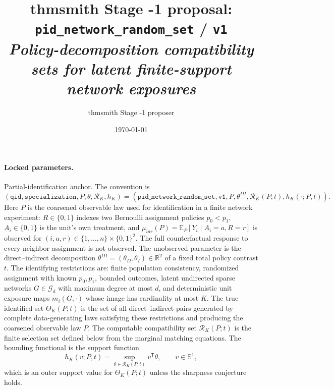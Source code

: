 \documentclass[11pt]{article}
\title{thmsmith Stage -1 proposal: \texttt{pid\_network\_random\_set} / \texttt{v1}%
  \\ \large\textit{Policy-decomposition compatibility sets for latent finite-support network exposures}}
\author{thmsmith Stage -1 proposer}
\date{\today}
\newcommand{\E}{\mathbb{E}}
\newcommand{\transpose}{\mathsf{T}}
\theoremstyle{definition}
\theoremstyle{plain}
\theoremstyle{remark}
\begin{document}
\maketitle


\paragraph{Locked parameters.}
Partial-identification anchor.  The convention is
\[
(\texttt{qid},\texttt{specialization},P,\theta,\mathcal R_K,h_K)
=
(\texttt{pid\_network\_random\_set},\texttt{v1},P,\theta^{DI},
\mathcal R_K(P;t),h_K(\cdot;P,t)).
\]
Here \(P\) is the coarsened observable law used for identification in a finite
network experiment: \(R\in\{0,1\}\) indexes two Bernoulli assignment policies
\(p_0<p_1\), \(A_i\in\{0,1\}\) is the unit's own treatment, and
\(\mu_{iar}(P)=\E_P[Y_i\mid A_i=a,R=r]\) is observed for
\((i,a,r)\in\{1,\ldots,n\}\times\{0,1\}^2\).  The full counterfactual response
to every neighbor assignment is not observed.
The unobserved parameter is the direct--indirect decomposition
\(\theta^{DI}=(\theta_D,\theta_I)\in\mathbb{R}^2\) of a fixed total policy
contrast \(t\).  The identifying restrictions are: finite population
consistency, randomized assignment with known \(p_0,p_1\), bounded outcomes,
latent undirected sparse networks \(G\in\mathcal G_d\) with maximum degree at
most \(d\), and deterministic unit exposure maps \(m_i(G,\cdot)\) whose image
has cardinality at most \(K\).  The true identified set \(\Theta_K(P;t)\) is the
set of all direct--indirect pairs generated by complete data-generating laws
satisfying these restrictions and producing the coarsened observable law \(P\).
The computable compatibility set \(\mathcal R_K(P;t)\) is the finite selection
set defined below from the marginal matching equations.  The bounding functional
is the support function
\[
h_K(v;P,t)=\sup_{\theta\in\mathcal R_K(P;t)} v^\transpose\theta,\qquad
v\in\mathbb{S}^1,
\]
which is an outer support value for \(\Theta_K(P;t)\) unless the sharpness
conjecture holds.
\end{document}
